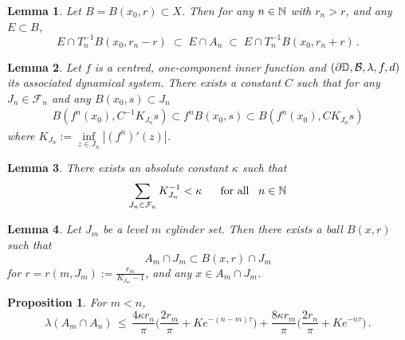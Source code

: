 \documentclass[10pt,a4paper]{amsart}
\newtheorem{proposition}{Proposition}
\newtheorem{lemma}{Lemma}
\newcommand{\D}{{\Bbb D}}
\newcommand{\N}{{\Bbb N}}
\begin{document}
    \begin{lemma}\label{trig}
    Let $B=B(x_0,r) \subset X$. Then for any $n \in \N$ with $r_n >r$, and any $E \subset B$, 
    $$
    E \cap T_n^{-1}B(x_0, r_n -r) \; \subset \; E \cap A_n \; \subset \;  E \cap T_n^{-1}B(x_0, r_n +r) \, .
    $$
\end{lemma}

\begin{lemma}\label{lcondconf}
    Let $f$ is a centred, one-component inner function and $(\partial \D,\mathcal{B},\lambda,f,d)$ its associated dynamical system. There exists a constant $C$ such that for any $J_n \in \mathcal{F}_n$ and any $B(x_0,s) \subset J_n$
\begin{eqnarray}\label{condconf}
    B(f^n(x_0), C^{-1}K_{J_n}s) \subset f^nB(x_0,s) \subset B(f^n(x_0),CK_{J_n}s) 
\end{eqnarray}
    where $K_{J_n}:=\inf\limits_{z \in J_n}|(f^n)'(z)|$.
\end{lemma}

\begin{lemma}\label{lcondsum}
There exists an absolute constant $\kappa$ such that 
    \begin{eqnarray}\label{condsum}
        \sum_{J_n \in \mathcal{F}_n}K_{J_n}^{-1} < \kappa \quad \text{ \ for all \ } \,  n \in \N
    \end{eqnarray}
\end{lemma}

    \begin{lemma}\label{boundball}
       Let $J_m$ be a level $m$ cylinder set. Then there exists a ball $B(x,r)$ such that  $$A_m \cap J_m \subset B(x,r) \cap J_m$$ for $r=r(m,J_m):= \frac{r_m}{K_{J_m}-1}$, and any $x \in A_m \cap J_m$.
    \end{lemma} 

    \begin{proposition}\label{measint}
        For $m < n$, 
        $$
        \lambda(A_m \cap A_n) \,  \leq \,  \frac{4\kappa r_n}{\pi}\big(\frac{2r_m}{\pi}+Ke^{-(n-m)\tau}\big) + \frac{8\kappa r_m}{\pi}\big(\frac{2r_n}{\pi}+Ke^{-n\tau} \big)\, .
        $$
    \end{proposition}
\end{document}
